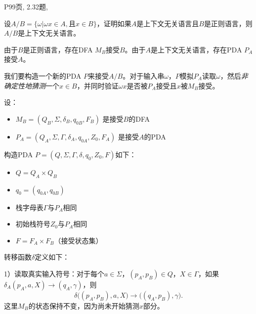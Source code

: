 \documentclass[11pt,addpoints,answers]{exam}
\begin{document}
\begin{questions}




    \question P99页, 2.32题, 

	设$A/B=\{\omega |\omega x\in A,\text{且}x\in B\}$，证明如果$A$是上下文无关语言且$B$是正则语言，则$A/B$是上下文无关语言。
	\begin{solution}
由于$B$是正则语言，存在DFA $M_B$接受$B$。由于$A$是上下文无关语言，存在PDA $P_A$接受$A$。

我们要构造一个新的PDA $P$来接受$A/B$。对于输入串$\omega$，$P$模拟$P_A$读取$\omega$，然后\emph{非确定性地猜测}一个$x\in B$，并同时验证$\omega x$是否被$P_A$接受且$x$被$M_B$接受。

设：
\begin{itemize}
    \item $M_B = (Q_B, \Sigma, \delta_B, q_{0B}, F_B)$ 是接受$B$的DFA
    \item $P_A = (Q_A, \Sigma, \Gamma, \delta_A, q_{0A}, Z_0, F_A)$ 是接受$A$的PDA
\end{itemize}

构造PDA $P = (Q, \Sigma, \Gamma, \delta, q_0, Z_0, F)$如下：
\begin{itemize}
    \item $Q = Q_A \times Q_B$
    \item $q_0 = (q_{0A}, q_{0B})$
    \item 栈字母表$\Gamma$与$P_A$相同
    \item 初始栈符号$Z_0$与$P_A$相同
    \item $F = F_A \times F_B$（接受状态集）
\end{itemize}

转移函数$\delta$定义如下：

1）读取真实输入符号：对于每个$a \in \Sigma$，$(p_A, p_B) \in Q$，$X \in \Gamma$，如果$\delta_A(p_A, a, X) \rightarrow (q_A, \gamma)$，则
\[
\delta\big( (p_A, p_B), a, X \big) \rightarrow \big( (q_A, p_B), \gamma \big).
\]
这里$M_B$的状态保持不变，因为尚未开始猜测$x$部分。


\end{solution}
\end{questions}
\end{document}
